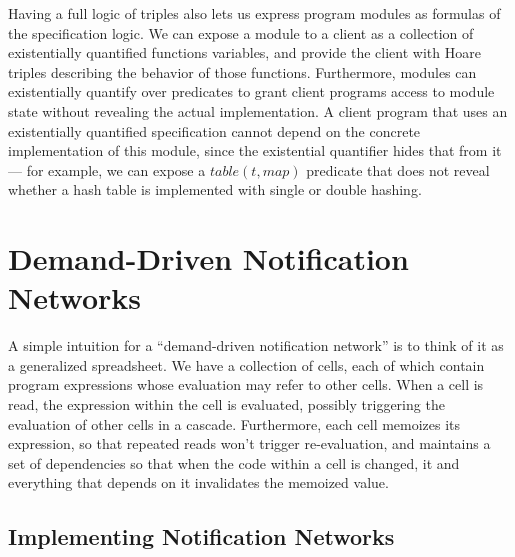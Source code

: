 \documentclass[preprint,natbib]{sigplanconf}
\begin{document}
Having a full logic of triples also lets us express program modules as
formulas of the specification logic. We can expose a module to a
client as a collection of existentially quantified functions
variables, and provide the client with Hoare triples describing the
behavior of those functions. Furthermore, modules can existentially
quantify over predicates to grant client programs access to module
state without revealing the actual implementation. A client program
that uses an existentially quantified specification cannot depend on
the concrete implementation of this module, since the existential
quantifier hides that from it --- for example, we can expose a
$table(t, map)$ predicate that does not reveal whether a hash table is
implemented with single or double hashing.

\section{Demand-Driven Notification Networks}

A simple intuition for a ``demand-driven notification network'' is to
think of it as a generalized spreadsheet. We have a collection of
cells, each of which contain program expressions whose evaluation may
refer to other cells. When a cell is read, the expression within the
cell is evaluated, possibly triggering the evaluation of other cells
in a cascade. Furthermore, each cell memoizes its expression, so that
repeated reads won't trigger re-evaluation, and maintains a set of
dependencies so that when the code within a cell is changed, it and
everything that depends on it invalidates the memoized value.

\subsection{Implementing Notification Networks}
\end{document}
